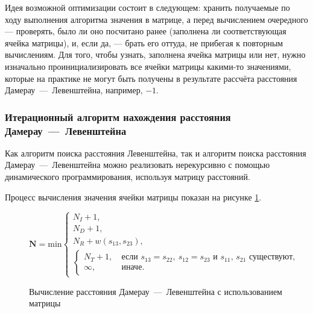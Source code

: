 Идея возможной оптимизации состоит в следующем: хранить получаемые по ходу выполнения алгоритма значения в матрице, а перед вычислением очередного --- проверять, было ли оно посчитано ранее (заполнена ли соответствующая ячейка матрицы), и, если да, --- брать его оттуда, не прибегая к повторным вычислениям.
Для того, чтобы узнать, заполнена ячейка матрицы или нет, нужно изначально проинициализировать все ячейки матрицы какими-то значениями, которые на практике не могут быть получены в результате рассчёта расстояния Дамерау~---~Левенштейна, например, $-1$.

\subsubsection{Итерационный алгоритм нахождения расстояния Дамерау~---~Левенштейна}

Как алгоритм поиска расстояния Левенштейна, так и алгоритм поиска расстояния Дамерау~---~Левенштейна можно реализовать нерекурсивно с помощью динамического программирования, используя матрицу расстояний.

Процесс вычисления значения ячейки матрицы показан на рисунке \ref{fig:dlmat}.

\begin{figure}[H]
    \begin{center}

        \( \boldsymbol{N} =
        \mathrm{min} \begin{cases}
    N_I + 1, \\
    N_D + 1, \\
    N_R + w(s_{13}, s_{23}), \\
            \begin{cases}
                N_T + 1,\ &\text{если $s_{13} = s_{22},\ s_{12} = s_{23}$ и $s_{11}$, $s_{21}$ существуют}, \\
                \infty,\ &\text{иначе}.
            \end{cases}
\end{cases} \)
    \end{center}
    \caption{Вычисление расстояния Дамерау~---~Левенштейна с использованием матрицы}
    \label{fig:dlmat}
\end{figure}

